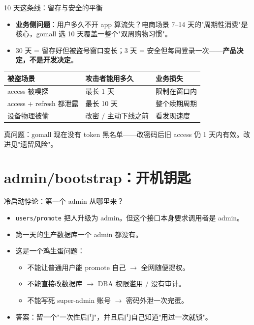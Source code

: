 \begin{frame}{10 天这条线：留存与安全的平衡}
\begin{itemize}
  \item \textbf{业务侧问题}：用户多久不开 app 算流失？电商场景 7--14 天的"周期性消费"是核心，gomall 选 10 天覆盖一整个"双周购物习惯"。
  \item 30 天 = 留存好但被盗号窗口变长；3 天 = 安全但每周登录一次——\textbf{产品决定，不是开发决定}。
\end{itemize}
\begin{tabular}{@{}lll@{}}
\toprule
被盗场景 & 攻击者能用多久 & 业务损失 \\
\midrule
access 被嗅探   & 最长 1 天          & 限制在窗口内 \\
access + refresh 都泄露 & 最长 10 天 & 整个续期周期 \\
设备物理被偷    & 改密 / 主动下线之前 & 看发现速度 \\
\bottomrule
\end{tabular}
\vspace{1mm}
\small 真问题：gomall 现在没有 token 黑名单——改密码后旧 access 仍 1 天内有效。改进见"遗留风险"。
\end{frame}

\section{admin/bootstrap：开机钥匙}

\begin{frame}{冷启动悖论：第一个 admin 从哪里来？}
\begin{itemize}
  \item \texttt{users/promote} 把人升级为 admin。但这个接口本身要求调用者是 admin。
  \item 第一天的生产数据库一个 admin 都没有。
  \item 这是一个鸡生蛋问题：
  \begin{itemize}
    \item 不能让普通用户能 promote 自己 $\to$ 全网随便提权。
    \item 不能直接改数据库 $\to$ DBA 权限滥用 / 没有审计。
    \item 不能写死 super-admin 账号 $\to$ 密码外泄一次完蛋。
  \end{itemize}
  \item 答案：留一个"一次性后门"，并且后门自己知道"用过一次就锁"。
\end{itemize}
\end{frame}

